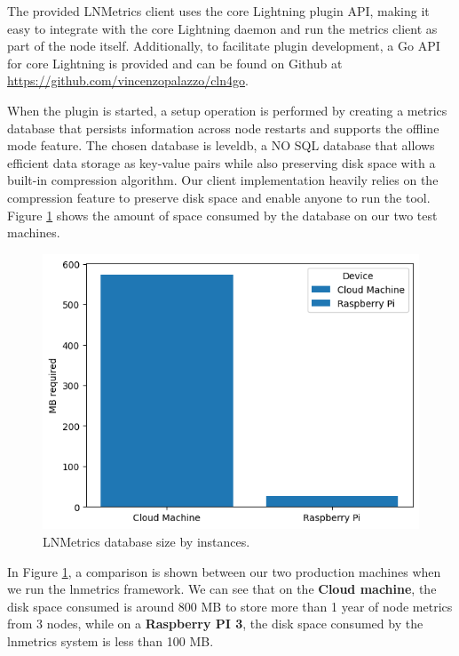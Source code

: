 The provided LNMetrics client uses the core Lightning plugin API, making it 
easy to integrate with the core Lightning daemon and run the metrics client as
part of the node itself. Additionally, to facilitate plugin development, a Go 
API for core Lightning is provided and can be found on Github at \url{https://github.com/vincenzopalazzo/cln4go}.

When the plugin is started, a setup operation is performed by creating a 
metrics database that persists information across node restarts and supports 
the offline mode feature. The chosen database is leveldb, a NO SQL database 
that allows efficient data storage as key-value pairs while also preserving 
disk space with a built-in compression algorithm. Our client implementation 
heavily relies on the compression feature to preserve disk space and enable 
anyone to run the tool. Figure \ref{fig:lnmetrics_diskspace} shows the amount 
of space consumed by the database on our two test machines.

\begin{figure}[H]
    \begin{center}
    \includegraphics[scale=0.7]{imgs/disk_space_servers.png}
    \end{center}
    \caption{LNMetrics database size by instances.}
    \label{fig:lnmetrics_diskspace}
\end{figure}

In Figure \ref{fig:lnmetrics_diskspace}, a comparison is shown between our two production
machines when we run the lnmetrics framework. We can see that on the {\bf Cloud machine}, the
disk space consumed is around 800 MB to store more than 1 year of node metrics from 3 nodes,
while on a {\bf Raspberry PI 3}, the disk space consumed by the lnmetrics system is less than 100 MB.

